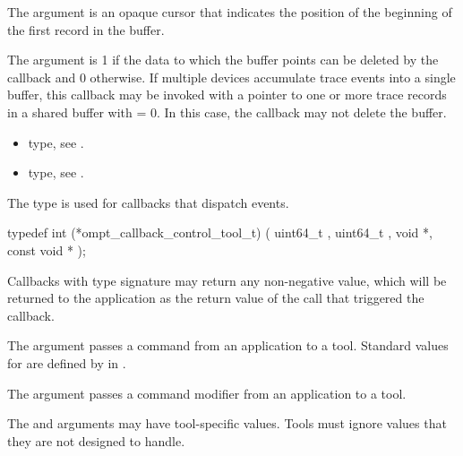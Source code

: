 The  argument is an opaque cursor that indicates the position 
of the beginning of the first record in the buffer.

The  argument is 1 if the data to which the buffer points
can be deleted by the callback and 0 otherwise. If multiple devices accumulate 
trace events into a single buffer, this callback may be invoked with a pointer 
to one or more trace records in a shared buffer with  = 0. 
In this case, the callback may not delete the buffer.

\crossreferences
\begin{itemize}
\item {} type, see .

\item {} type, see .
\end{itemize}



\label{sec:ompt_callback_control_tool_t}

\summary
The  type is used for callbacks that 
dispatch  events.

\format

\begin{ccppspecific}
\begin{omptCallback}
typedef int (*ompt_callback_control_tool_t) (
  uint64_t ,
  uint64_t ,
  void *,
  const void *
);
\end{omptCallback}
\end{ccppspecific}

\descr
Callbacks with type signature  may return 
any non-negative value, which will be returned to the application as the return 
value of the  call that triggered the callback.

\argdesc
The  argument passes a command from an application to a tool. 
Standard values for  are defined by  
in .

The  argument passes a command modifier from an application to a tool.

The  and  arguments may have tool-specific values.
Tools must ignore  values that they are not designed to handle.

